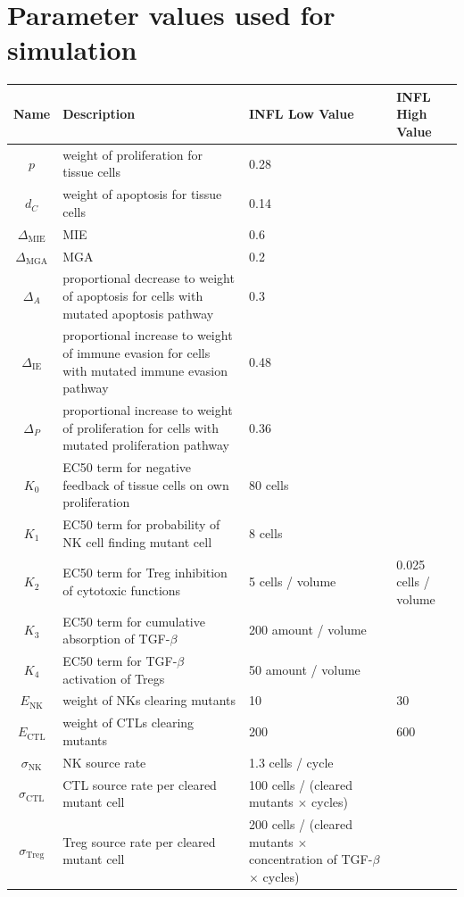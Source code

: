 \documentclass[11pt, a4paper, preprint]{article}
\begin{document}
\newpage
\section{Parameter values used for simulation}

\begin{longtable}{| c | p{5cm} | m{3cm} | m{3cm} |} 
 \hline
 Name & Description & INFL Low Value & INFL High Value  \\ [0.5ex] 
 \hline\hline
  $p$ & weight of proliferation for tissue cells & 0.28 & \\ 
 \hline
 $d_C$  & weight of apoptosis for tissue cells & 0.14 & \\
 \hline
$\Delta_\text{MIE}$ & MIE & 0.6 & \\
 \hline
 $\Delta_\text{MGA}$ & MGA  & 0.2 &  \\
 \hline
  $\Delta_A$ & proportional decrease to weight of apoptosis for cells with mutated apoptosis pathway & 0.3 &  \\
  \hline
  $\Delta_\text{IE}$ & proportional increase to weight of immune evasion for cells with mutated immune evasion pathway & 0.48 &  \\
  \hline
  $\Delta_P$ & proportional increase to weight of proliferation for cells with mutated proliferation pathway & 0.36 &  \\
  \hline
 $K_0$ & EC50 term for negative feedback of tissue cells on own proliferation & 80 cells& \\
 \hline
 $K_1$ & EC50 term for probability of NK cell finding mutant cell & 8 cells& \\
 \hline
  $K_2$ & EC50 term for Treg inhibition of cytotoxic functions & 5 cells / volume & 0.025 cells / volume \\
  \hline
  $K_3$ & EC50 term for cumulative absorption of TGF-$\beta$ & 200 amount / volume & \\
  \hline
  $K_4$ & EC50 term for TGF-$\beta$ activation of Tregs & 50 amount / volume & \\
  \hline
 $E_\text{NK}$ & weight of NKs clearing mutants & 10 & 30  \\
  \hline
  $E_\text{CTL}$ & weight of CTLs clearing mutants & 200 & 600 \\
  \hline
  $\sigma_\text{NK}$ & NK source rate & 1.3 cells / cycle &  \\ 
  \hline
  $\sigma_\text{CTL}$ & CTL source rate per cleared mutant cell & 100 cells / (cleared mutants $\times$ cycles)& \\ 
  \hline
  $\sigma_\text{Treg}$ & Treg source rate per cleared mutant cell & 200 cells / (cleared mutants $\times$ concentration of TGF-$\beta$ $\times$ cycles)& \\ 

\end{longtable}
\end{document}
